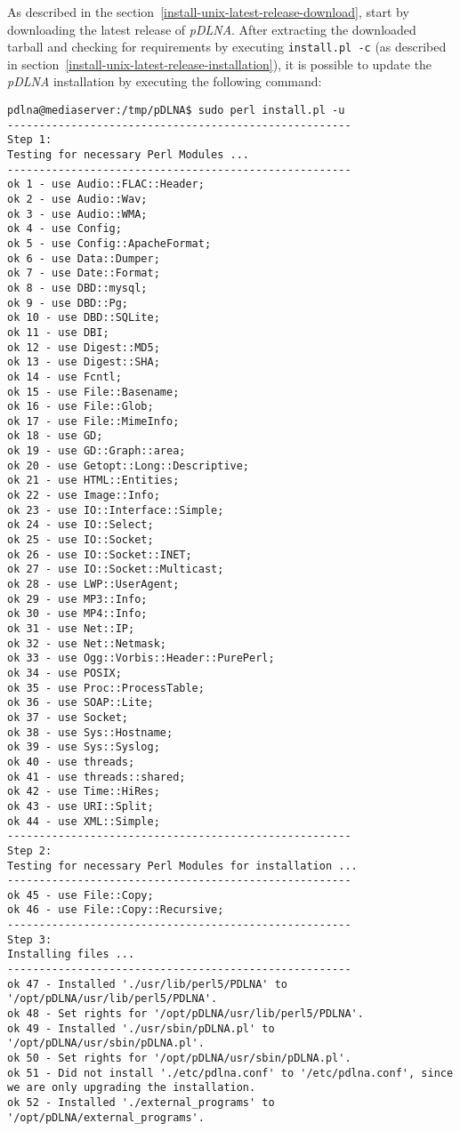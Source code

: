 As described in the section~\ref{install-unix-latest-release-download}, start by downloading the latest release of {\em pDLNA}. After extracting the downloaded tarball and checking for requirements by executing \verb|install.pl -c| (as described in section~\ref{install-unix-latest-release-installation}), it is possible to update the {\em pDLNA} installation by executing the following command:
\begin{lstlisting}
pdlna@mediaserver:/tmp/pDLNA$ sudo perl install.pl -u
------------------------------------------------------
Step 1:
Testing for necessary Perl Modules ...
------------------------------------------------------
ok 1 - use Audio::FLAC::Header;
ok 2 - use Audio::Wav;
ok 3 - use Audio::WMA;
ok 4 - use Config;
ok 5 - use Config::ApacheFormat;
ok 6 - use Data::Dumper;
ok 7 - use Date::Format;
ok 8 - use DBD::mysql;
ok 9 - use DBD::Pg;
ok 10 - use DBD::SQLite;
ok 11 - use DBI;
ok 12 - use Digest::MD5;
ok 13 - use Digest::SHA;
ok 14 - use Fcntl;
ok 15 - use File::Basename;
ok 16 - use File::Glob;
ok 17 - use File::MimeInfo;
ok 18 - use GD;
ok 19 - use GD::Graph::area;
ok 20 - use Getopt::Long::Descriptive;
ok 21 - use HTML::Entities;
ok 22 - use Image::Info;
ok 23 - use IO::Interface::Simple;
ok 24 - use IO::Select;
ok 25 - use IO::Socket;
ok 26 - use IO::Socket::INET;
ok 27 - use IO::Socket::Multicast;
ok 28 - use LWP::UserAgent;
ok 29 - use MP3::Info;
ok 30 - use MP4::Info;
ok 31 - use Net::IP;
ok 32 - use Net::Netmask;
ok 33 - use Ogg::Vorbis::Header::PurePerl;
ok 34 - use POSIX;
ok 35 - use Proc::ProcessTable;
ok 36 - use SOAP::Lite;
ok 37 - use Socket;
ok 38 - use Sys::Hostname;
ok 39 - use Sys::Syslog;
ok 40 - use threads;
ok 41 - use threads::shared;
ok 42 - use Time::HiRes;
ok 43 - use URI::Split;
ok 44 - use XML::Simple;
------------------------------------------------------
Step 2:
Testing for necessary Perl Modules for installation ...
------------------------------------------------------
ok 45 - use File::Copy;
ok 46 - use File::Copy::Recursive;
------------------------------------------------------
Step 3:
Installing files ...
------------------------------------------------------
ok 47 - Installed './usr/lib/perl5/PDLNA' to '/opt/pDLNA/usr/lib/perl5/PDLNA'.
ok 48 - Set rights for '/opt/pDLNA/usr/lib/perl5/PDLNA'.
ok 49 - Installed './usr/sbin/pDLNA.pl' to '/opt/pDLNA/usr/sbin/pDLNA.pl'.
ok 50 - Set rights for '/opt/pDLNA/usr/sbin/pDLNA.pl'.
ok 51 - Did not install './etc/pdlna.conf' to '/etc/pdlna.conf', since we are only upgrading the installation.
ok 52 - Installed './external_programs' to '/opt/pDLNA/external_programs'.

\end{lstlisting}
